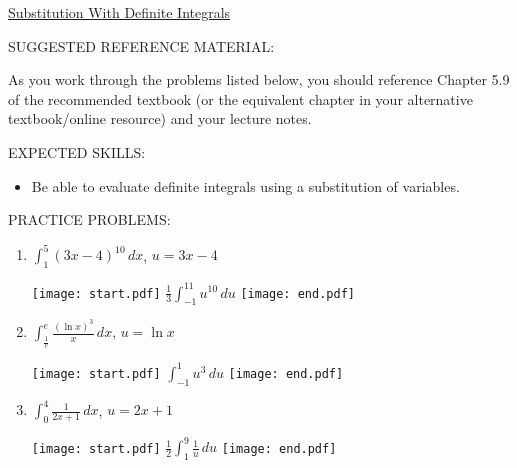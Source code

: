 \documentclass[12pt]{article}
\begin{document}
\begin{center}
\underline{\LARGE{Substitution With Definite Integrals}}
\end{center}

\noindent SUGGESTED REFERENCE MATERIAL:

\bigskip

\noindent As you work through the problems listed below, you should reference Chapter 5.9 of the recommended textbook (or the equivalent chapter in your alternative textbook/online resource) and your lecture notes.

\bigskip


\noindent EXPECTED SKILLS:

\begin{itemize}

\item Be able to evaluate definite integrals using a substitution of variables.

\end{itemize}

\noindent PRACTICE PROBLEMS:

\medskip


\begin{enumerate}

\item $\int_1^5 (3x-4)^{10} \,dx$, $u=3x-4$

\texttt{[image: start.pdf]}
{{$\frac{1}{3}\int_{-1}^{11} u^{10} \,du$}}
\texttt{[image: end.pdf]}


\item $\int_{\frac{1}{e}}^{e} \frac{(\ln{x})^3}{x} \,dx$, $u=\ln{x}$

\texttt{[image: start.pdf]}
{{$\int_{-1}^1 u^3 \,du$}}
\texttt{[image: end.pdf]}


\item $\int_0^4 \frac{1}{2x+1} \,dx$, $u=2x+1$

\texttt{[image: start.pdf]}
{{$\frac{1}{2} \int_1^9 \frac{1}{u} \,du$}}
\texttt{[image: end.pdf]}


\end{enumerate}

\end{document}
